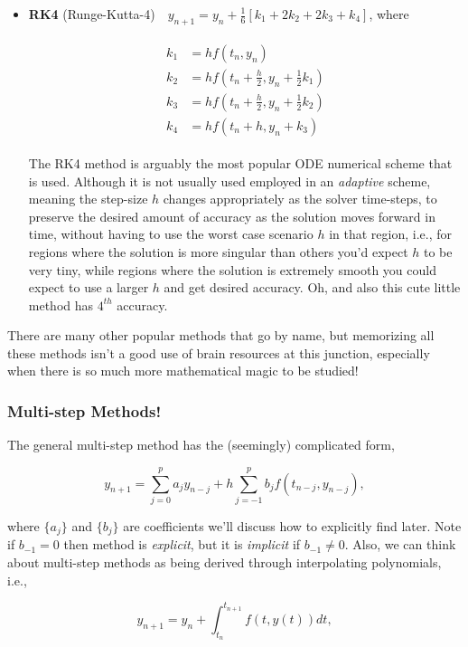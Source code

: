 \documentclass[paper=a4, fontsize=11pt]{scrartcl} %
\numberwithin{equation}{section} %
\numberwithin{figure}{section} %
\numberwithin{table}{section} %
\begin{document}
\begin{itemize}
\item {\bf{RK4}} (Runge-Kutta-4)\ \ $y_{n+1} = y_{n} + \frac{1}{6} \left[ k_1 + 2k_2 + 2k_3 + k_4  \right]$, where

\begin{align}
\nonumber
\begin{split}
k_1 &=  h f(t_n,y_n) \\
k_2 &= h f(t_n+\frac{h}{2}, y_n+ \frac{1}{2} k_1) \\
k_3 &= h f(t_n+\frac{h}{2}, y_n+ \frac{1}{2} k_2) \\
k_4 &= h f(t_n+h, y_n+k_3)
\end{split}	
\end{align}

	The RK4 method is arguably the most popular ODE numerical scheme that is used. Although it is not usually used employed in an \emph{adaptive} scheme, meaning the step-size $h$ changes appropriately as the solver time-steps, to preserve the desired amount of accuracy as the solution moves forward in time, without having to use the worst case scenario $h$ in that region, i.e., for regions where the solution is more singular than others you'd expect $h$ to be very tiny, while regions where the solution is extremely smooth you could expect to use a larger $h$ and get desired accuracy. Oh, and also this cute little method has $4^{th}$ accuracy.

\end{itemize}

There are many other popular methods that go by name, but memorizing all these methods isn't a good use of brain resources at this junction, especially when there is so much more mathematical magic to be studied!

\subsubsection{Multi-step Methods!}

The general multi-step method has the (seemingly) complicated form,

$$y_{n+1} = \sum_{j=0}^{p} a_{j} y_{n-j} + h \sum_{j=-1}^{p} b_j f(t_{n-j},y_{n-j}),$$

where $\{a_{j}\}$ and $\{b_j\}$ are coefficients we'll discuss how to explicitly find later. Note if $b_{-1}=0$ then method is \emph{explicit}, but it is \emph{implicit} if $b_{-1}\neq 0$. Also, we can think about multi-step methods as being derived through interpolating polynomials, i.e.,

$$y_{n+1} = y_n + \int_{t_n}^{t_{n+1}} f(t,y(t)) dt,$$
\end{document}
